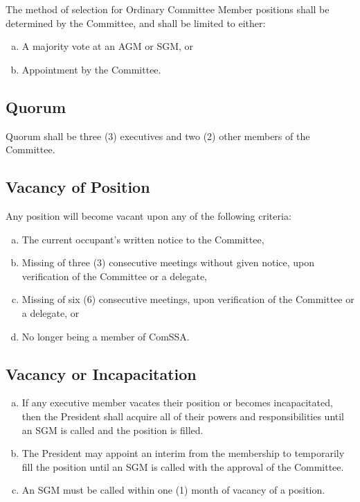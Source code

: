 \documentclass[a4paper,12pt]{article}
\begin{document}
The method of selection for Ordinary Committee Member positions shall be determined by the Committee, and shall be limited to either:

\begin{enumerate}[a)]
	\item A majority vote at an AGM or SGM, or
	\item Appointment by the Committee.
\end{enumerate}

\subsection{Quorum}

Quorum shall be three (3) executives and two (2) other members of the Committee.

\subsection{Vacancy of Position}

Any position will become vacant upon any of the following criteria:

\begin{enumerate}[a)]
	\item The current occupant's written notice to the Committee,
	\item Missing of three (3) consecutive meetings without given notice, upon verification of the Committee or a delegate,
	\item Missing of six (6) consecutive meetings, upon verification of the Committee or a delegate, or
	\item No longer being a member of ComSSA.
\end{enumerate}

\subsection{Vacancy or Incapacitation}

\begin{enumerate}[a)]
	\item If any executive member vacates their position or becomes incapacitated, then the President shall acquire all of their powers and responsibilities until an SGM is called and the position is filled.
	\item The President may appoint an interim from the membership to temporarily fill the position until an SGM is called with the approval of the Committee.
	\item An SGM must be called within one (1) month of vacancy of a position.
\end{enumerate}
\end{document}
